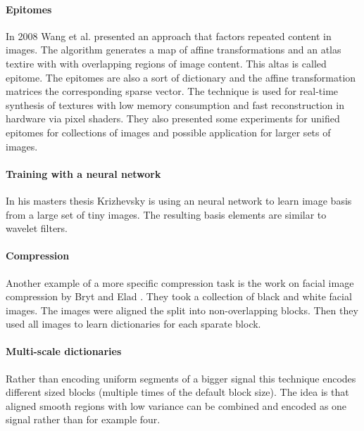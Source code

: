 
\paragraph{Epitomes} In 2008 Wang et al.\cite{Wang2008a} presented
an approach that factors repeated content in images. The algorithm generates 
a map of affine transformations and an atlas textire with with overlapping
regions of image content. This altas is called epitome. The epitomes are also a
sort of dictionary and the affine transformation matrices 
the corresponding sparse vector. The technique is used for real-time synthesis
of textures with low memory consumption and  fast reconstruction in hardware via
pixel shaders. They also presented some experiments for unified epitomes for
collections of images and possible application for larger sets of images. 


\paragraph{Training with a neural network} In his masters thesis 
Krizhevsky \cite{Krizhevsky2009} is using an neural network to learn image basis
from a large set of tiny images. The resulting basis elements are similar to
wavelet filters.

\paragraph{Compression} \cite{Lewicki1999,Murray2006}  
Another example of a more specific compression task is the
work on facial image compression by Bryt and Elad \cite{Bryt2008}. 
They took a collection of black and white facial images. The images were aligned
the split into non-overlapping blocks. Then they used all images to learn 
dictionaries for each sparate block. 

\paragraph{Multi-scale dictionaries}
Rather than encoding uniform segments of a bigger signal this technique
encodes different sized blocks (multiple times of the default block size). The
idea is that aligned smooth regions with low variance can be combined
and encoded as one signal rather than for example four.\cite{Mairal2007}

